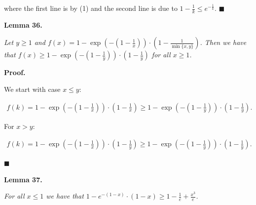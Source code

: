 where the first line is by (1) and the second line is due to $1-\frac{1}{k}\leq e^{-\frac{1}{k}}$.
\ensuremath{\blacksquare}\par






\par\medskip\noindent\textbf{\textbf{Lemma 36}\textbf{.}}\par



\emph{Let $y\geq 1$ and $f(x)=1-\exp\left(-\left(1-\frac{1}{x}\right)\right)\cdot\left(1-\frac{1}{\min\{x,y\}}\right)$.
Then we have that
$f(x)\geq 1-\exp\left(-\left(1-\frac{1}{y}\right)\right)\cdot\left(1-\frac{1}{y}\right)$ for all $x\geq 1$.}\par






\par\medskip\noindent\textbf{Proof.}\par



We start with case $x\leq y$:\par


\[\begin{gathered}
\displaystyle f(k)=1-\exp\left(-\left(1-\frac{1}{x}\right)\right)\cdot\left(1-\frac{1}{x}\right)\geq 1-\exp\left(-\left(1-\frac{1}{y}\right)\right)\cdot\left(1-\frac{1}{y}\right).
\end{gathered}\]


For $x>y$:\par


\[\begin{gathered}
\displaystyle f(k)=1-\exp\left(-\left(1-\frac{1}{x}\right)\right)\cdot\left(1-\frac{1}{y}\right)\geq 1-\exp\left(-\left(1-\frac{1}{y}\right)\right)\cdot\left(1-\frac{1}{y}\right).
\end{gathered}\]


\ensuremath{\blacksquare}\par






\par\medskip\noindent\textbf{\textbf{Lemma 37}\textbf{.}}\par



\emph{For all $x\leq 1$ we have that $1-e^{-(1-x)}\cdot(1-x)\geq 1-\frac{1}{e}+\frac{x^{3}}{e}$.}\par




